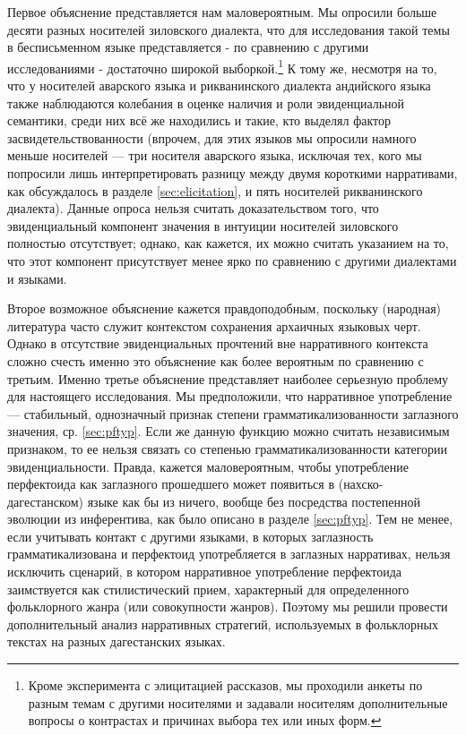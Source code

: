 Первое объяснение представляется нам маловероятным. Мы опросили больше десяти разных носителей зиловского диалекта, что для исследования такой темы в бесписьменном языке представляется - по сравнению с другими исследованиями - достаточно широкой выборкой.\footnote{Кроме эксперимента с элицитацией рассказов, мы проходили анкеты по разным темам с другими носителями и задавали носителям дополнительные вопросы о контрастах и причинах выбора тех или иных форм.} К тому же, несмотря на то, что у носителей аварского языка и рикванинского диалекта андийского языка также наблюдаются колебания в оценке наличия и роли эвиденциальной семантики, среди них всё же находились и такие, кто выделял фактор засвидетельствованности (впрочем, для этих языков мы опросили намного меньше носителей --- три носителя аварского языка, исключая тех, кого мы попросили лишь интерпретировать разницу между двумя короткими нарративами, как обсуждалось в разделе \ref{sec:elicitation}, и пять носителей рикванинского диалекта). Данные опроса нельзя считать доказательством того, что эвиденциальный компонент значения в интуиции носителей зиловского полностью отсутствует; однако, как кажется, их можно считать указанием на то, что этот компонент присутствует менее ярко по сравнению с другими диалектами и языками. 
\par Второе возможное объяснение кажется правдоподобным, поскольку (народная) литература часто служит контекстом сохранения архаичных языковых черт. Однако в отсутствие эвиденциальных прочтений вне нарративного контекста сложно счесть именно это объяснение как более вероятным по сравнению с третьим. Именно третье объяснение представляет наиболее серьезную проблему для настоящего исследования. Мы предположили, что нарративное употребление --- стабильный, однозначный признак степени грамматикализованности заглазного значения, ср. \ref{sec:pftyp}. Если же данную функцию можно считать независимым признаком, то ее нельзя связать со степенью грамматикализованности категории эвиденциальности. Правда, кажется маловероятным, чтобы употребление перфектоида как заглазного прошедшего может появиться в  (нахско-дагестанском) языке как бы из ничего, вообще без посредства постепенной эволюции из инферентива, как было описано в разделе \ref{sec:pftyp}. Тем не менее, если учитывать контакт с другими языками, в которых заглазность грамматикализована и перфектоид употребляется в заглазных нарративах, нельзя исключить сценарий, в котором нарративное употребление перфектоида заимствуется как стилистический прием, характерный для определенного фольклорного жанра (или совокупности жанров). Поэтому мы решили провести дополнительный анализ нарративных стратегий, используемых в фольклорных текстах на разных дагестанских языках.


